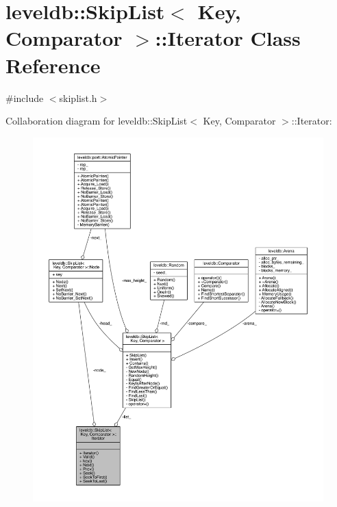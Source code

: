 \hypertarget{classleveldb_1_1_skip_list_1_1_iterator}{}\section{leveldb\+:\+:Skip\+List$<$ Key, Comparator $>$\+:\+:Iterator Class Reference}
\label{classleveldb_1_1_skip_list_1_1_iterator}


{\ttfamily \#include $<$skiplist.\+h$>$}



Collaboration diagram for leveldb\+:\+:Skip\+List$<$ Key, Comparator $>$\+:\+:Iterator\+:\nopagebreak
\begin{figure}[H]
\begin{center}
\leavevmode
\includegraphics[width=350pt]{classleveldb_1_1_skip_list_1_1_iterator__coll__graph}
\end{center}
\end{figure}
